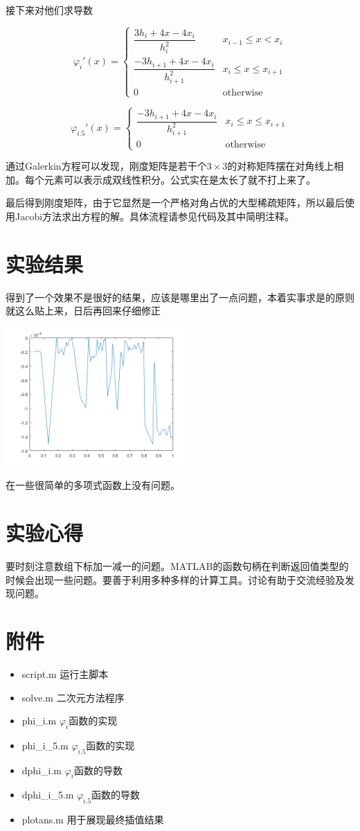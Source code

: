 \documentclass[11pt, a4paper]{article}
\begin{document}
接下来对他们求导数

\begin{equation}
	\varphi_i'(x)=\left\{
	\begin{array}{cr}
		\dfrac{3h_i+4x-4x_i}{h_i^2} & x_{i-1}\le x<x_i\\
		\dfrac{-3h_{i+1}+4x-4x_i}{h_{i+1}^2} & x_{i}\le x\le x_{i+1}\\
		0 & \text{otherwise}
	\end{array}
	\right.
\end{equation}

\begin{equation}
	\varphi_{i.5}'(x)=\left\{
	\begin{array}{cr}
		\dfrac{-3h_{i+1}+4x-4x_i}{h_{i+1}^2} & x_{i}\le x\le x_{i+1}\\
		0 & \text{otherwise}
	\end{array}
	\right.
\end{equation}

通过Galerkin方程可以发现，刚度矩阵是若干个$3\times 3$的对称矩阵摆在对角线上相加。每个元素可以表示成双线性积分。公式实在是太长了就不打上来了。

最后得到刚度矩阵，由于它显然是一个严格对角占优的大型稀疏矩阵，所以最后使用Jacobi方法求出方程的解。具体流程请参见代码及其中简明注释。

\section{实验结果}
得到了一个效果不是很好的结果，应该是哪里出了一点问题，本着实事求是的原则就这么贴上来，日后再回来仔细修正

\includegraphics[width=200pt]{res.png}

在一些很简单的多项式函数上没有问题。

\section{实验心得}

要时刻注意数组下标加一减一的问题。MATLAB的函数句柄在判断返回值类型的时候会出现一些问题。要善于利用多种多样的计算工具。讨论有助于交流经验及发现问题。


\section{附件}
\begin{itemize}
	\item script.m 运行主脚本
	\item solve.m 二次元方法程序
	\item phi\_i.m $\varphi_i$函数的实现
	\item phi\_i\_5.m $\varphi_{i.5}$函数的实现
	\item dphi\_i.m $\varphi_i$函数的导数
	\item dphi\_i\_5.m $\varphi_{i.5}$函数的导数
	\item plotans.m 用于展现最终插值结果
\end{itemize}
\end{document}
